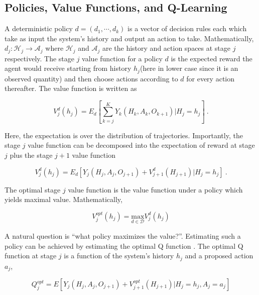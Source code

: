 \subsection{Policies, Value Functions, and Q-Learning}

A deterministic policy $ d = (d_1, \cdots, d_k) $ is a vector of decision rules each which take as input the system’s history and output an action to take.  Mathematically, $d_j : \mathcal{H}_j \to \mathcal{A}_j$ where $\mathcal{H}_j$ and $\mathcal{A}_j$ are the history and action spaces at stage $j$ respectively.  The stage $ j $ value function for a policy $ d $ is the expected reward the agent would receive starting from history $ h_j  $(here in lower case since it is an observed quantity) and then choose actions according to $ d $ for every action thereafter.  The value function is written as

\begin{equation}
	V^d_j(h_j) = E_d\left[ \sum_{k=j}^K Y_k(H_k, A_k, O_{k+1}) \Bigg\lvert H_j = h_j\right] \>.
\end{equation}

\noindent Here, the expectation is over the distribution of trajectories. Importantly, the stage $ j $ 
value function can be decomposed into the expectation of reward at stage $ j $ plus the stage $ j+1  $ value function  \cite{chakraborty2013statistical}

\begin{equation}
V^d_j(h_j) = E_d\left[Y_j(H_j, A_j, O_{j+1}) + V^d_{j+1}(H_{j+1}) \vert H_j = h_j\right] \>.
\end{equation}


\noindent The optimal stage $ j  $ value function is the value function under a policy which yields maximal value.  Mathematically, 

\begin{equation}
V^{opt}_j(h_j) = \underset{d \in \mathscr{D}}{\mbox{max}} V^d_j(h_j)
\end{equation}

\noindent A natural question is “what policy maximizes the value?”. Estimating such a policy can be achieved by estimating the optimal Q function \cite{chakraborty2013statistical}.  The optimal Q function at stage $ j $ is a function of the system’s history $ h_j $ and a proposed action $ a_j $,

\begin{equation}
 Q_j^{opt} = E \left[ 
 Y_j(H_j, A_j, O_{j+1}) + V^{opt}_{j+1}(H_{j+1}) \lvert H_j = h_j, A_j = a_j
 \right]
\end{equation}

